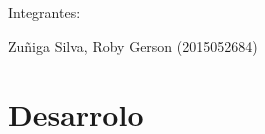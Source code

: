 \documentclass[preprint,12pt]{elsarticle}
\begin{document}
\begin{titlepage}
\begin{center}
\vspace*{0.2in}
\vspace*{0.1in}
\begin{large}
Integrantes: \\
\begin{flushleft}


Zuñiga Silva, Roby Gerson  	           \hfill	(2015052684) \\


\end{flushleft}
\end{large}
\end{center}

\end{titlepage}


\section{Desarrolo}
\end{document}
